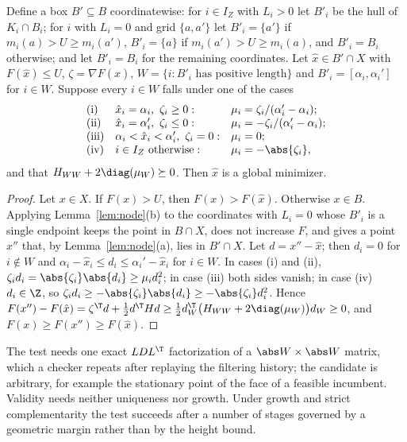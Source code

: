 \begin{proposition}\label{prop:local}
Define a box $B'\subseteq B$ coordinatewise: for $i\in I_Z$ with $L_i>0$ let
$B'_i$ be the hull of $K_i\cap B_i$; for $i$ with $L_i=0$ and grid $\{a,a'\}$ let
$B'_i=\{a'\}$ if $m_i(a)>U\ge m_i(a')$, $B'_i=\{a\}$ if $m_i(a')>U\ge m_i(a)$, and
$B'_i=B_i$ otherwise; and let $B'_i=B_i$ for the remaining coordinates. Let
$\hat x\in B'\cap X$ with $F(\hat x)\le U$, $\zeta=\nabla F(\hat x)$,
$W=\{i:B'_i\text{ has positive length}\}$ and $B'_i=[\alpha_i,\alpha_i']$ for
$i\in W$. Suppose every $i\in W$ falls under one of the cases
\[
\begin{array}{lll}
\text{(i)}&\hat x_i=\alpha_i,\ \zeta_i\ge0:&\mu_i=\zeta_i/(\alpha_i'-\alpha_i);\\
\text{(ii)}&\hat x_i=\alpha_i',\ \zeta_i\le0:&\mu_i=-\zeta_i/(\alpha_i'-\alpha_i);\\
\text{(iii)}&\alpha_i<\hat x_i<\alpha_i',\ \zeta_i=0:&\mu_i=0;\\
\text{(iv)}&i\in I_Z\text{ otherwise}:&\mu_i=-\abs{\zeta_i},
\end{array}
\]
and that $H_{WW}+2\diag(\mu_W)\succeq0$. Then $\hat x$ is a global minimizer.
\end{proposition}

\begin{proof}
Let $x\in X$. If $F(x)>U$, then $F(x)>F(\hat x)$. Otherwise $x\in B$. Applying
Lemma~\ref{lem:node}(b) to the coordinates with $L_i=0$ whose $B'_i$ is a
single endpoint keeps the point in $B\cap X$, does not increase $F$, and gives
a point $x''$ that, by Lemma~\ref{lem:node}(a), lies in $B'\cap X$. Let
$d=x''-\hat x$; then $d_i=0$ for $i\notin W$ and
$\alpha_i-\hat x_i\le d_i\le\alpha_i'-\hat x_i$ for $i\in W$. In cases (i) and (ii),
$\zeta_id_i=\abs{\zeta_i}\abs{d_i}\ge\mu_id_i^2$; in case (iii) both sides vanish;
in case (iv) $d_i\in\Z$, so $\zeta_id_i\ge-\abs{\zeta_i}\abs{d_i}\ge-\abs{\zeta_i}d_i^2$.
Hence
$F(x'')-F(\hat x)=\zeta^\T d+\frac12d^\T Hd\ge\frac12d_W^\T\bigl(H_{WW}+2\diag(\mu_W)\bigr)d_W\ge0$,
and $F(x)\ge F(x'')\ge F(\hat x)$.
\end{proof}

The test needs one exact $LDL^\T$ factorization of a $\abs W\times\abs W$ matrix,
which a checker repeats after replaying the filtering history; the candidate
is arbitrary, for example the stationary point of the face of a feasible
incumbent. Validity needs neither uniqueness nor growth. Under growth and
strict complementarity the test succeeds after a number of stages governed by
a geometric margin rather than by the height bound.


